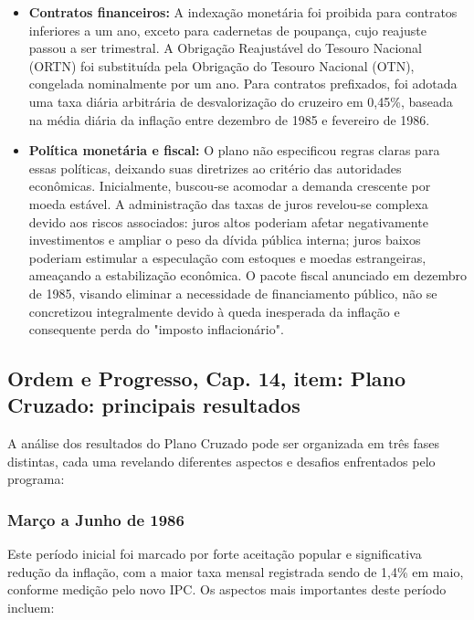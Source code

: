 \documentclass[a4paper,12pt]{article}[abntex2]
\begin{document}
\begin{itemize}
    \item \textbf{Contratos financeiros:} A indexação monetária foi proibida para contratos inferiores a um ano, exceto para cadernetas de poupança, cujo reajuste passou a ser trimestral. A Obrigação Reajustável do Tesouro Nacional (ORTN) foi substituída pela Obrigação do Tesouro Nacional (OTN), congelada nominalmente por um ano. Para contratos prefixados, foi adotada uma taxa diária arbitrária de desvalorização do cruzeiro em 0,45\%, baseada na média diária da inflação entre dezembro de 1985 e fevereiro de 1986.

    \item \textbf{Política monetária e fiscal:} O plano não especificou regras claras para essas políticas, deixando suas diretrizes ao critério das autoridades econômicas. Inicialmente, buscou-se acomodar a demanda crescente por moeda estável. A administração das taxas de juros revelou-se complexa devido aos riscos associados: juros altos poderiam afetar negativamente investimentos e ampliar o peso da dívida pública interna; juros baixos poderiam estimular a especulação com estoques e moedas estrangeiras, ameaçando a estabilização econômica. O pacote fiscal anunciado em dezembro de 1985, visando eliminar a necessidade de financiamento público, não se concretizou integralmente devido à queda inesperada da inflação e consequente perda do "imposto inflacionário".
\end{itemize}

\subsection{\textbf{Ordem e Progresso, Cap. 14, item: Plano Cruzado: principais resultados}}

A análise dos resultados do Plano Cruzado pode ser organizada em três fases distintas, cada uma revelando diferentes aspectos e desafios enfrentados pelo programa:

\subsubsection{\textbf{Março a Junho de 1986}}

Este período inicial foi marcado por forte aceitação popular e significativa redução da inflação, com a maior taxa mensal registrada sendo de 1,4\% em maio, conforme medição pelo novo IPC. Os aspectos mais importantes deste período incluem:
\end{document}
